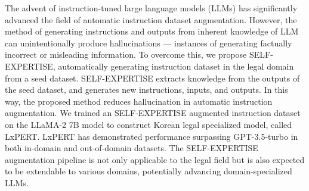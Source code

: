 The advent of instruction-tuned large language models (LLMs) has significantly advanced the field of automatic instruction dataset augmentation. However, the method of generating instructions and outputs from inherent knowledge of LLM can unintentionally produce hallucinations — instances of generating factually incorrect or misleading information. To overcome this, we propose SELF-EXPERTISE, automatically generating instruction dataset in the legal domain from a seed dataset. SELF-EXPERTISE extracts knowledge from the outputs of the seed dataset, and generates new instructions, inputs, and outputs. In this way, the proposed method reduces hallucination in automatic instruction augmentation. We trained an SELF-EXPERTISE augmented instruction dataset on the LLaMA-2 7B model to construct Korean legal specialized model, called LxPERT. LxPERT has demonstrated performance surpassing GPT-3.5-turbo in both in-domain and out-of-domain datasets. The SELF-EXPERTISE augmentation pipeline is not only applicable to the legal field but is also expected to be extendable to various domains, potentially advancing domain-specialized LLMs.